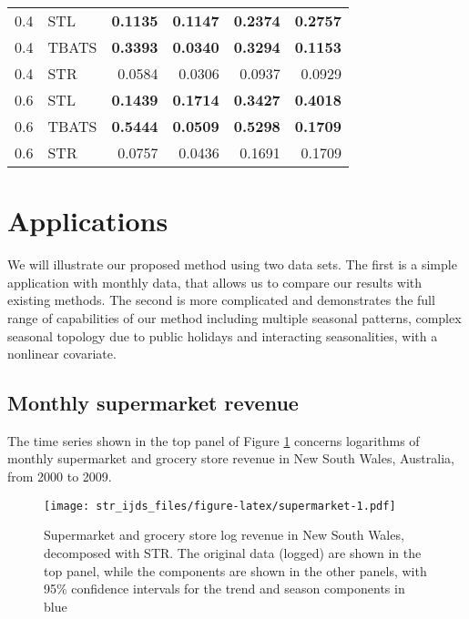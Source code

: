 \documentclass[11pt,a4paper,]{article}
\begin{document}
\begin{table}[!ht]
\begin{tabular}[t]{rlrrrr}
\midrule
\hspace{1em}0.4 & STL & \textbf{0.1135} & \textbf{0.1147} & \textbf{0.2374} & \textbf{0.2757}\\
\hspace{1em}0.4 & TBATS & \textbf{0.3393} & \textbf{0.0340} & \textbf{0.3294} & \textbf{0.1153}\\
\hspace{1em}0.4 & STR & 0.0584 & 0.0306 & 0.0937 & 0.0929\\
\midrule
\hspace{1em}0.6 & STL & \textbf{0.1439} & \textbf{0.1714} & \textbf{0.3427} & \textbf{0.4018}\\
\hspace{1em}0.6 & TBATS & \textbf{0.5444} & \textbf{0.0509} & \textbf{0.5298} & \textbf{0.1709}\\
\hspace{1em}0.6 & STR & 0.0757 & 0.0436 & 0.1691 & 0.1709\\
\bottomrule
\end{tabular}
\end{table}

\hypertarget{applications}{%
\section{Applications}\label{applications}}

We will illustrate our proposed method using two data sets. The first is a simple application with monthly data, that allows us to compare our results with existing methods. The second is more complicated and demonstrates the full range of capabilities of our method including multiple seasonal patterns, complex seasonal topology due to public holidays and interacting seasonalities, with a nonlinear covariate.

\hypertarget{ssec:simple}{%
\subsection{Monthly supermarket revenue}\label{ssec:simple}}

The time series shown in the top panel of Figure \ref{fig:supermarket} concerns logarithms of monthly supermarket and grocery store revenue in New South Wales, Australia, from 2000 to 2009.

\begin{figure}
\centering
\texttt{[image: str\_ijds\_files/figure-latex/supermarket-1.pdf]}
\caption{\label{fig:supermarket}Supermarket and grocery store log revenue in New South Wales, decomposed with STR. The original data (logged) are shown in the top panel, while the components are shown in the other panels, with 95\% confidence intervals for the trend and season components in blue}
\end{figure}
\end{document}
